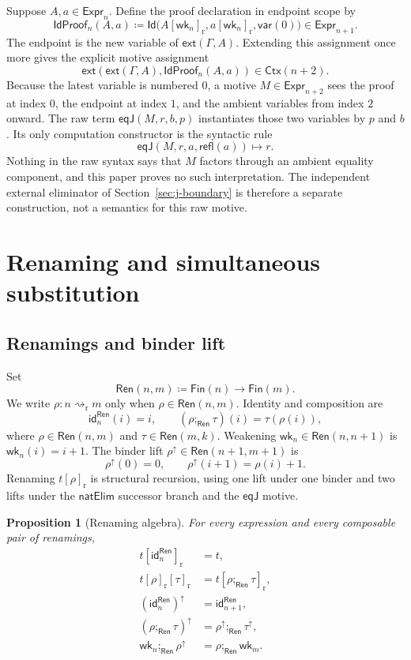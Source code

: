 \documentclass[10pt,reqno]{amsart}
\newtheorem{proposition}[theorem]{Proposition}
\newcommand{\Fin}{\mathsf{Fin}}
\newcommand{\Expr}{\mathsf{Expr}}
\newcommand{\Ctx}{\mathsf{Ctx}}
\newcommand{\Ext}[2]{\mathsf{ext}(#1,#2)}
\newcommand{\Ren}{\mathsf{Ren}}
\newcommand{\Var}{\mathsf{var}}
\newcommand{\NatElim}{\mathsf{natElim}}
\newcommand{\IdTy}{\mathsf{Id}}
\newcommand{\Refl}{\mathsf{refl}}
\newcommand{\EqJ}{\mathsf{eqJ}}
\newcommand{\red}{\mathrel{\longmapsto}}
\newcommand{\idren}{\mathsf{id}}
\newcommand{\wk}{\mathsf{wk}}
\newcommand{\lift}{\uparrow}
\begin{document}
Suppose \(A,a\in\Expr_n\).  Define the proof declaration in endpoint scope by
\[
 \mathsf{IdProof}_n(A,a)
   \coloneqq
   \IdTy\bigl(A[\wk_n]_{\mathrm r},
              a[\wk_n]_{\mathrm r},\Var(0)\bigr)
   \in\Expr_{n+1}.
\tag{3.2}\label{eq:idproof-definition}
\]
The endpoint is the new variable of \(\Ext{\Gamma}{A}\).  Extending this
assignment once more gives the explicit motive assignment
\[
 \Ext{\Ext{\Gamma}{A}}{\mathsf{IdProof}_n(A,a)}
   \in\Ctx(n+2).
\tag{3.3}\label{eq:motive-context}
\]
Because the latest variable is numbered \(0\), a motive
\(M\in\Expr_{n+2}\) sees the proof at index \(0\), the endpoint at index
\(1\), and the ambient variables from index \(2\) onward.  The raw term
\(\EqJ(M,r,b,p)\) instantiates those two variables by \(p\) and \(b\).
Its only computation constructor is the syntactic rule
\[
                 \EqJ(M,r,a,\Refl(a))\red r.
\]
Nothing in the raw syntax says that \(M\) factors through an ambient equality
component, and this paper proves no such interpretation.  The independent
external eliminator of Section~\ref{sec:j-boundary} is therefore a separate
construction, not a semantics for this raw motive.

\section{Renaming and simultaneous substitution}
\label{sec:substitution}

\subsection{Renamings and binder lift}

Set
\[
                  \Ren(n,m)\coloneqq\Fin(n)\to\Fin(m).
\]
We write \(\rho:n\rightsquigarrow_{\mathrm r}m\) only when
\(\rho\in\Ren(n,m)\).  Identity and composition are
\[
  \idren^{\Ren}_n(i)=i,\qquad
  (\rho;_{\Ren}\tau)(i)=\tau(\rho(i)),
\]
where \(\rho\in\Ren(n,m)\) and \(\tau\in\Ren(m,k)\).
Weakening \(\wk_n\in\Ren(n,n+1)\) is \(\wk_n(i)=i+1\).  The binder lift
\(\rho^\lift\in\Ren(n+1,m+1)\) is
\[
        \rho^\lift(0)=0,\qquad
        \rho^\lift(i+1)=\rho(i)+1.
\tag{4.1}\label{eq:ren-lift}
\]
Renaming \(t[\rho]_{\mathrm r}\) is structural recursion, using one lift
under one binder and two lifts under the \(\NatElim\) successor branch and
the \(\EqJ\) motive.

\begin{proposition}[Renaming algebra]
\label{prop:renaming}
For every expression and every composable pair of renamings,
\[
\begin{aligned}
t[\idren^{\Ren}_n]_{\mathrm r}&=t,\\
t[\rho]_{\mathrm r}[\tau]_{\mathrm r}
  &=t[\rho;_{\Ren}\tau]_{\mathrm r},\\
(\idren^{\Ren}_n)^\lift&=\idren^{\Ren}_{n+1},\\
(\rho;_{\Ren}\tau)^\lift&=\rho^\lift;_{\Ren}\tau^\lift,\\
\wk_n;_{\Ren}\rho^\lift&=\rho;_{\Ren}\wk_m.
\end{aligned}
\]
\end{proposition}
\end{document}

